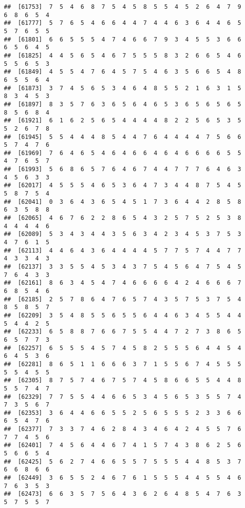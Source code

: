 \documentclass[
]{book}
\begin{document}
\begin{verbatim}
##  [61753]  7  5  4  6  8  7  5  4  5  8  5  5  4  5  2  6  4  7  9  6  8  6  5  4
##  [61777]  5  7  6  5  4  6  6  4  4  7  4  4  6  3  6  4  4  6  5  5  7  6  5  5
##  [61801]  6  6  5  5  5  4  7  4  6  6  7  9  3  4  5  5  3  6  6  6  5  6  4  5
##  [61825]  4  4  5  6  5  4  6  7  5  5  5  8  3  2  6  6  5  4  6  5  5  6  5  3
##  [61849]  4  5  5  4  7  6  4  5  7  5  4  6  3  5  6  6  5  4  8  6  5  5  6  4
##  [61873]  3  7  4  5  6  5  3  4  6  4  8  5  5  2  1  6  3  1  5  8  3  4  5  3
##  [61897]  8  3  5  7  6  3  6  5  6  4  6  5  3  6  5  6  5  6  5  8  5  6  8  4
##  [61921]  6  1  6  2  5  6  5  4  4  4  4  8  2  2  5  6  5  3  5  5  2  6  7  8
##  [61945]  5  5  4  4  4  8  5  4  4  7  6  4  4  4  4  7  5  6  6  5  7  4  7  6
##  [61969]  7  6  4  6  5  4  6  4  6  6  4  6  4  6  6  6  6  5  5  4  7  6  5  7
##  [61993]  5  6  8  6  5  7  6  4  6  7  4  4  7  7  7  6  4  6  3  4  5  6  3  3
##  [62017]  4  5  5  5  4  6  5  3  6  4  7  3  4  4  8  7  5  4  5  5  8  7  5  4
##  [62041]  0  3  6  4  3  6  5  4  5  1  7  3  6  4  4  2  8  5  8  6  3  5  8  8
##  [62065]  4  6  7  6  2  2  8  6  5  4  3  2  5  7  5  2  5  3  8  4  4  4  4  6
##  [62089]  5  3  4  3  4  4  3  5  6  3  4  2  3  4  5  3  7  5  3  4  7  6  1  5
##  [62113]  4  4  6  4  3  6  4  4  4  4  5  7  7  5  7  4  4  7  7  4  3  3  4  3
##  [62137]  3  3  5  5  4  5  3  4  3  7  5  4  5  6  4  7  5  4  5  7  6  4  3  3
##  [62161]  8  6  3  4  5  4  7  4  6  6  6  6  4  2  4  6  6  6  7  6  8  5  4  6
##  [62185]  2  5  7  8  6  4  7  6  5  7  4  3  5  7  5  3  7  5  4  8  5  8  5  7
##  [62209]  3  5  4  8  5  5  6  5  5  6  4  4  6  3  4  5  5  4  4  5  4  4  2  5
##  [62233]  6  5  8  8  7  6  6  7  5  5  4  4  7  2  7  3  8  6  5  6  5  7  7  3
##  [62257]  6  5  5  5  4  5  7  4  5  8  2  5  5  5  6  4  4  5  4  6  4  5  3  6
##  [62281]  8  6  5  1  1  6  6  6  3  7  1  5  5  6  7  4  5  5  5  5  5  4  5  5
##  [62305]  8  7  5  7  4  6  7  5  7  4  5  8  6  6  5  5  4  4  8  5  5  7  4  7
##  [62329]  7  7  5  5  4  4  6  6  5  3  4  5  6  5  3  5  5  7  4  7  3  5  6  7
##  [62353]  3  6  4  4  6  6  5  5  2  5  6  5  5  5  2  3  3  6  6  6  5  4  7  6
##  [62377]  7  3  3  7  4  6  2  8  4  3  4  6  4  2  4  5  5  7  6  7  7  4  5  6
##  [62401]  7  4  5  6  4  4  6  7  4  1  5  7  4  3  8  6  2  5  6  5  6  6  5  4
##  [62425]  5  6  2  7  4  6  6  5  5  7  5  5  5  4  4  8  5  3  7  6  6  8  6  6
##  [62449]  3  6  5  5  2  4  6  7  6  1  5  5  5  4  4  5  5  4  6  7  6  3  5  3
##  [62473]  6  6  3  5  7  5  6  4  3  6  2  6  4  8  5  4  7  6  3  5  7  5  5  7

\end{verbatim}
\end{document}
